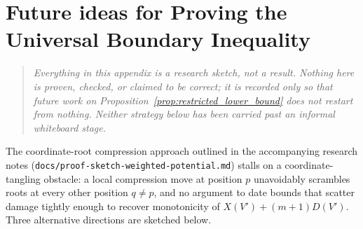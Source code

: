 \section{Future ideas for Proving the Universal Boundary Inequality}\label{app:alt-strategies}

\begin{quote}
\textit{Everything in this appendix is a research sketch, not a result.
Nothing here is proven, checked, or claimed to be correct; it is recorded
only so that future work on Proposition~\ref{prop:restricted_lower_bound} does not
restart from nothing. Neither strategy below has been carried past an
informal whiteboard stage.}
\end{quote}

The coordinate-root compression approach outlined in the accompanying
research notes (\texttt{docs/proof-\allowbreak sketch-\allowbreak weighted-potential.md}) stalls
on a coordinate-tangling obstacle: a local compression move at position
$p$ unavoidably scrambles roots at every other position $q \neq p$, and no
argument to date bounds that scatter damage tightly enough to recover
monotonicity of $X(V') + (m+1)D(V')$. Three alternative directions are
sketched below.

